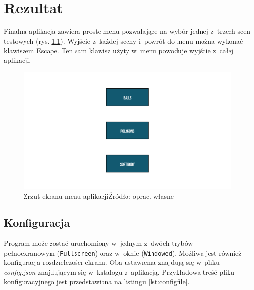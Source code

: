 



\clearpage




\chapter{Rezultat}
Finalna aplikacja zawiera proste menu pozwalające na wybór jednej z~trzech scen testowych (rys. \ref{fig:menu}). Wyjście z~każdej sceny i~powrót do menu można wykonać klawiszem Escape. Ten sam klawisz użyty w~menu powoduje wyjście z~całej aplikacji.

\begin{figure}[h]
	\centering
	\includegraphics[width=0.7\linewidth]{images/screenshot-menu}
	\caption[Zrzut ekranu menu aplikacji]{Zrzut ekranu menu aplikacji\newline Źródło: oprac. własne}
	\label{fig:menu}
\end{figure}


\section{Konfiguracja}
Program może zostać uruchomiony w~jednym z~dwóch trybów --- pełnoekranowym (\verb|Fullscreen|) oraz w~oknie (\verb|Windowed|). Możliwa jest również konfiguracja rozdzielczości ekranu. Oba ustawienia znajdują się w~pliku \textit{config.json} znajdującym się w~katalogu z~aplikacją. Przykładowa treść pliku konfiguracyjnego jest przedstawiona na listingu \ref{lst:configfile}.

